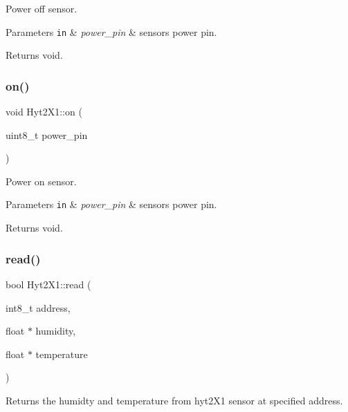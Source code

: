 Power off sensor. 


\begin{DoxyParams}[1]{Parameters}
\mbox{\tt in}  & {\em power\+\_\+pin} & sensors power pin. \\
\hline
\end{DoxyParams}
\begin{DoxyReturn}{Returns}
void. 
\end{DoxyReturn}
\mbox{\label{namespaceHyt2X1_a37cb490fe77882a734352359f0c2fba5}} 
\subsubsection{\texorpdfstring{on()}{on()}}
{\footnotesize\ttfamily void Hyt2\+X1\+::on (\begin{DoxyParamCaption}\item[{uint8\+\_\+t}]{power\+\_\+pin }\end{DoxyParamCaption})}



Power on sensor. 


\begin{DoxyParams}[1]{Parameters}
\mbox{\tt in}  & {\em power\+\_\+pin} & sensors power pin. \\
\hline
\end{DoxyParams}
\begin{DoxyReturn}{Returns}
void. 
\end{DoxyReturn}
\mbox{\label{namespaceHyt2X1_ab2e26ccda85abca1e0d3f29bd5ea7039}} 
\subsubsection{\texorpdfstring{read()}{read()}}
{\footnotesize\ttfamily bool Hyt2\+X1\+::read (\begin{DoxyParamCaption}\item[{int8\+\_\+t}]{address,  }\item[{float $\ast$}]{humidity,  }\item[{float $\ast$}]{temperature }\end{DoxyParamCaption})}



Returns the humidty and temperature from hyt2\+X1 sensor at specified address. 


